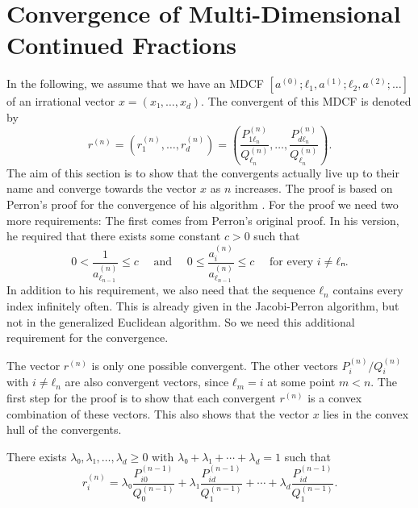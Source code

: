 \section{Convergence of Multi-Dimensional Continued Fractions}

In the following, we assume that we have an MDCF $[a^{(0)}; ℓ_1, a^{(1)}; ℓ_2, a^{(2)}; …]$
of an irrational vector $x = (x₁, …, x_d)$.
The convergent of this MDCF is denoted by
\[
  r^{(n)}
  = (r_1^{(n)}, …, r_d^{(n)})
  = \left( \frac{P_{1ℓ_n}^{(n)}}{Q_{ℓ_n}^{(n)}}, \dots, \frac{P_{dℓ_n}^{(n)}}{Q_{ℓ_n}^{(n)}} \right).
\]
The aim of this section is to show that the convergents actually live up to
their name and converge towards the vector $x$ as $n$ increases.
The proof is based on Perron's proof for the convergence of his
algorithm \cite{Perron07}.
For the proof we need two more requirements:
The first comes from Perron's original proof.
In his version, he required that there exists some constant $c > 0$ such that
\[
  0 < \frac{1}{a_{ℓ_{n-1}}^{(n)}} ≤ c
  \quad \text{ and } \quad
  0 ≤ \frac{a_i^{(n)}}{a_{ℓ_{n-1}}^{(n)}} ≤ c \quad \text{ for every } i ≠ ℓₙ.
\]
In addition to his requirement, we also need that the sequence $ℓ_n$
contains every index infinitely often.
This is already given in the Jacobi-Perron algorithm,
but not in the generalized Euclidean algorithm.
So we need this additional requirement for the convergence.

The vector $r^{(n)}$ is only one possible convergent.
The other vectors $P_i^{(n)}/Q_i^{(n)}$ with $i ≠ ℓ_n$ are also convergent
vectors, since $ℓ_m = i$ at some point $m < n$.
The first step for the proof is to show that each convergent $r^{(n)}$ is a
convex combination of these vectors.
This also shows that the vector $x$ lies in the convex hull of the convergents.

\begin{lemma}
  \label{lem:conv-conv}
  There exists $λ₀, λ₁, …, λ_d ≥ 0$ with $λ₀ + λ₁ + ⋯ + λ_d = 1$ such that
  \[
    r_i^{(n)} = λ₀ \frac{P_{i0}^{(n-1)}}{Q_0^{(n-1)}} + λ₁ \frac{P_{id}^{(n-1)}}{Q_1^{(n-1)}} + ⋯ + λ_d \frac{P_{id}^{(n-1)}}{Q_1^{(n-1)}}.
  \]
\end{lemma}

